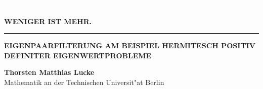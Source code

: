 \begin{titlepage}

\textcolor{white}{c}
\vspace{2cm}
\begin{center}
\Huge
\textbf{\glqq WENIGER IST MEHR.\grqq}

\vspace{-.5cm}
\rule{5cm}{1pt}
\vspace{.5cm}

\large

\textbf{EIGENPAARFILTERUNG AM BEISPIEL HERMITESCH POSITIV DEFINITER EIGENWERTPROBLEME}
\end{center}

\vfill
\normalsize
\textbf{Thorsten Matthias Lucke}\\
Mathematik an der Technischen Universit"at Berlin

\end{titlepage}
